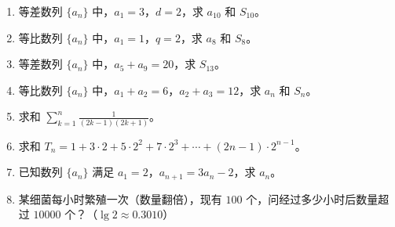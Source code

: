 \documentclass[12pt, a4paper]{ctexart}
\begin{document}
\begin{enumerate}
  \item 等差数列 $\{a_n\}$ 中，$a_1 = 3$，$d = 2$，求 $a_{10}$ 和 $S_{10}$。
  \vspace{1.5cm}

  \item 等比数列 $\{a_n\}$ 中，$a_1 = 1$，$q = 2$，求 $a_8$ 和 $S_8$。
  \vspace{1.5cm}

  \item 等差数列 $\{a_n\}$ 中，$a_5 + a_9 = 20$，求 $S_{13}$。
  \vspace{1.5cm}

  \item 等比数列 $\{a_n\}$ 中，$a_1 + a_2 = 6$，$a_2 + a_3 = 12$，求 $a_n$ 和 $S_n$。
  \vspace{2cm}

  \item 求和 $\displaystyle\sum_{k=1}^{n} \frac{1}{(2k-1)(2k+1)}$。
  \vspace{1.5cm}

  \item 求和 $T_n = 1 + 3 \cdot 2 + 5 \cdot 2^2 + 7 \cdot 2^3 + \cdots + (2n-1) \cdot 2^{n-1}$。
  \vspace{2cm}

  \item 已知数列 $\{a_n\}$ 满足 $a_1 = 2$，$a_{n+1} = 3a_n - 2$，求 $a_n$。
  \vspace{2cm}

  \item 某细菌每小时繁殖一次（数量翻倍），现有 $100$ 个，问经过多少小时后数量超过 $10000$ 个？（$\lg 2 \approx 0.3010$）
  \vspace{2cm}
\end{enumerate}
\end{document}
